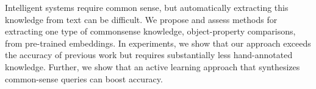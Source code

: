 Intelligent systems require common sense, but automatically extracting this knowledge from text can be difficult.  We propose and assess methods for extracting one type of commonsense knowledge, object-property comparisons, from pre-trained embeddings.  In experiments, we show that our approach exceeds the accuracy of previous work but requires substantially less hand-annotated knowledge.  Further, we show that an active learning approach that synthesizes common-sense queries can boost accuracy.
